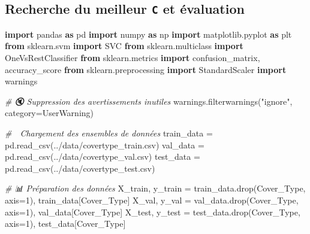\documentclass[
]{article}
\newenvironment{Shaded}{}{}
\newcommand{\CommentTok}[1]{\textcolor[rgb]{0.38,0.63,0.69}{\textit{#1}}}
\newcommand{\DecValTok}[1]{\textcolor[rgb]{0.25,0.63,0.44}{#1}}
\newcommand{\ImportTok}[1]{\textcolor[rgb]{0.00,0.50,0.00}{\textbf{#1}}}
\newcommand{\NormalTok}[1]{#1}
\newcommand{\OperatorTok}[1]{\textcolor[rgb]{0.40,0.40,0.40}{#1}}
\newcommand{\PreprocessorTok}[1]{\textcolor[rgb]{0.74,0.48,0.00}{#1}}
\newcommand{\StringTok}[1]{\textcolor[rgb]{0.25,0.44,0.63}{#1}}
\begin{document}
\subsection{\texorpdfstring{Recherche du meilleur \texttt{C} et
évaluation}{Recherche du meilleur C et évaluation}}\label{recherche-du-meilleur-c-et-uxe9valuation}

\begin{Shaded}
\begin{Highlighting}[]
\ImportTok{import}\NormalTok{ pandas }\ImportTok{as}\NormalTok{ pd}
\ImportTok{import}\NormalTok{ numpy }\ImportTok{as}\NormalTok{ np}
\ImportTok{import}\NormalTok{ matplotlib.pyplot }\ImportTok{as}\NormalTok{ plt}
\ImportTok{from}\NormalTok{ sklearn.svm }\ImportTok{import}\NormalTok{ SVC}
\ImportTok{from}\NormalTok{ sklearn.multiclass }\ImportTok{import}\NormalTok{ OneVsRestClassifier}
\ImportTok{from}\NormalTok{ sklearn.metrics }\ImportTok{import}\NormalTok{ confusion\_matrix, accuracy\_score}
\ImportTok{from}\NormalTok{ sklearn.preprocessing }\ImportTok{import}\NormalTok{ StandardScaler}
\ImportTok{import}\NormalTok{ warnings}

\CommentTok{\# 🔇 Suppression des avertissements inutiles}
\NormalTok{warnings.filterwarnings(}\StringTok{"ignore"}\NormalTok{, category}\OperatorTok{=}\PreprocessorTok{UserWarning}\NormalTok{)}

\CommentTok{\# 🔄 Chargement des ensembles de données}
\NormalTok{train\_data }\OperatorTok{=}\NormalTok{ pd.read\_csv(}\StringTok{\textquotesingle{}../data/covertype\_train.csv\textquotesingle{}}\NormalTok{)}
\NormalTok{val\_data }\OperatorTok{=}\NormalTok{ pd.read\_csv(}\StringTok{\textquotesingle{}../data/covertype\_val.csv\textquotesingle{}}\NormalTok{)}
\NormalTok{test\_data }\OperatorTok{=}\NormalTok{ pd.read\_csv(}\StringTok{\textquotesingle{}../data/covertype\_test.csv\textquotesingle{}}\NormalTok{)}

\CommentTok{\# 📊 Préparation des données}
\NormalTok{X\_train, y\_train }\OperatorTok{=}\NormalTok{ train\_data.drop(}\StringTok{\textquotesingle{}Cover\_Type\textquotesingle{}}\NormalTok{, axis}\OperatorTok{=}\DecValTok{1}\NormalTok{), train\_data[}\StringTok{\textquotesingle{}Cover\_Type\textquotesingle{}}\NormalTok{]}
\NormalTok{X\_val, y\_val }\OperatorTok{=}\NormalTok{ val\_data.drop(}\StringTok{\textquotesingle{}Cover\_Type\textquotesingle{}}\NormalTok{, axis}\OperatorTok{=}\DecValTok{1}\NormalTok{), val\_data[}\StringTok{\textquotesingle{}Cover\_Type\textquotesingle{}}\NormalTok{]}
\NormalTok{X\_test, y\_test }\OperatorTok{=}\NormalTok{ test\_data.drop(}\StringTok{\textquotesingle{}Cover\_Type\textquotesingle{}}\NormalTok{, axis}\OperatorTok{=}\DecValTok{1}\NormalTok{), test\_data[}\StringTok{\textquotesingle{}Cover\_Type\textquotesingle{}}\NormalTok{]}


\end{Highlighting}
\end{Shaded}
\end{document}
